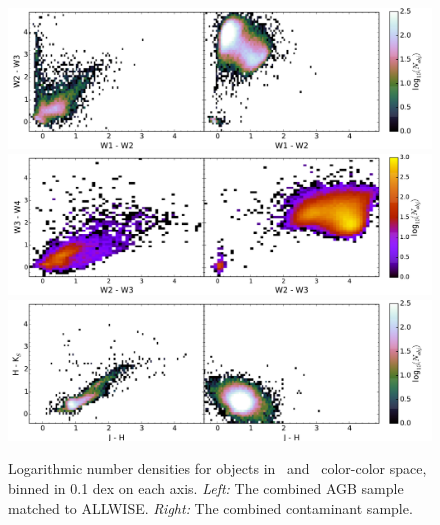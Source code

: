 \begin{figure}
\includegraphics[width=7in]{figs/agbs_contaminants_color_color1.pdf}
\includegraphics[width=7in]{figs/agbs_contaminants_color_color2.pdf}
\includegraphics[width=7in]{figs/agbs_contaminants_color_color3.pdf}
\caption{Logarithmic number densities for objects in \wise\, and \twomass\, color-color space, binned in 0.1 dex on each axis. \emph{Left:} The combined AGB sample matched to ALLWISE. \emph{Right:} The combined contaminant sample.\label{fig:distros}}
\end{figure}

